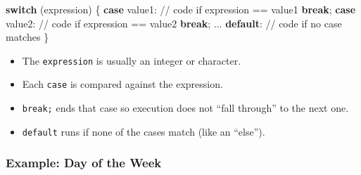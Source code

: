 \documentclass[
  letterpaper,
  DIV=11,
  numbers=noendperiod]{scrreprt}
\newenvironment{Shaded}{\begin{snugshade}}{\end{snugshade}}
\newcommand{\CommentTok}[1]{\textcolor[rgb]{0.37,0.37,0.37}{#1}}
\newcommand{\ControlFlowTok}[1]{\textcolor[rgb]{0.00,0.23,0.31}{\textbf{#1}}}
\newcommand{\NormalTok}[1]{\textcolor[rgb]{0.00,0.23,0.31}{#1}}
\newcommand{\OperatorTok}[1]{\textcolor[rgb]{0.37,0.37,0.37}{#1}}
\providecommand{\tightlist}{%
  \setlength{\itemsep}{0pt}\setlength{\parskip}{0pt}}
\begin{document}
\begin{Shaded}
\begin{Highlighting}[]
\ControlFlowTok{switch} \OperatorTok{(}\NormalTok{expression}\OperatorTok{)} \OperatorTok{\{}
    \ControlFlowTok{case}\NormalTok{ value1}\OperatorTok{:}
        \CommentTok{// code if expression == value1}
        \ControlFlowTok{break}\OperatorTok{;}
    \ControlFlowTok{case}\NormalTok{ value2}\OperatorTok{:}
        \CommentTok{// code if expression == value2}
        \ControlFlowTok{break}\OperatorTok{;}
    \OperatorTok{...}
    \ControlFlowTok{default}\OperatorTok{:}
        \CommentTok{// code if no case matches}
\OperatorTok{\}}
\end{Highlighting}
\end{Shaded}

\begin{itemize}
\tightlist
\item
  The \texttt{expression} is usually an integer or character.
\item
  Each \texttt{case} is compared against the expression.
\item
  \texttt{break;} ends that case so execution does not ``fall through''
  to the next one.
\item
  \texttt{default} runs if none of the cases match (like an ``else'').
\end{itemize}

\subsubsection{Example: Day of the Week}\label{example-day-of-the-week}
\end{document}
